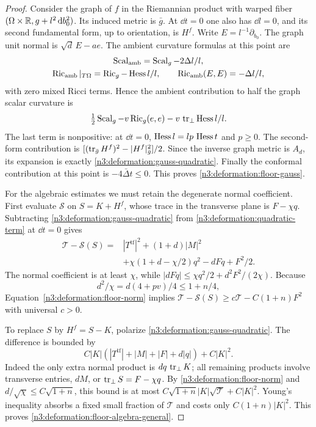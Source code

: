 \begin{proof}
Consider the graph of $f$ in the Riemannian product with warped fiber
$(\Omega\times\mathbb R,g+l^2\,\mathrm d b_0^2)$. Its induced metric is $\bar g$.
At $\dd t=0$ one also has $\dd l=0$, and its second fundamental form,
up to orientation, is $H^f$. Write $E=l^{-1}\partial_{b_0}$.
The graph unit normal is $\sqrt d\,E-ae$. The ambient curvature formulas
at this point are
\[
 \begin{gathered}
 \operatorname{Scal}_{\mathrm{amb}}=\operatorname{Scal}_g-2\Delta l/l,\\
 \operatorname{Ric}_{\mathrm{amb}}|_{T\Omega}=\operatorname{Ric}_g-\operatorname{Hess} l/l,\qquad
 \operatorname{Ric}_{\mathrm{amb}}(E,E)=-\Delta l/l,
 \end{gathered}
\]
with zero mixed Ricci terms. Hence the ambient contribution to half the
graph scalar curvature is
\[
 \tfrac12\operatorname{Scal}_g-v\operatorname{Ric}_g(e,e)
      -v\,\operatorname{tr}_\perp\operatorname{Hess} l/l.
\]
The last term is nonpositive: at $\dd t=0$,
$\operatorname{Hess} l=lp\,\operatorname{Hess} t$ and $p\ge0$.
The second-form contribution is
$[(\operatorname{tr}_{\bar g}H^f)^2-|H^f|_{\bar g}^2]/2$.
Since the inverse graph metric is $A_d$, its expansion is exactly
\eqref{n3:deformation:gauss-quadratic}.
Finally the conformal contribution at this point is
$-4\bar\Delta t\le0$. This proves \eqref{n3:deformation:floor-gauss}.

For the algebraic estimates we must retain the degenerate normal
coefficient. First evaluate $\mathcal S$ on
$S=K+H^f$, whose trace in the transverse plane is $F-\chi q$.
Subtracting \eqref{n3:deformation:gauss-quadratic} from
\eqref{n3:deformation:quadratic-term} at $\dd t=0$ gives
\begin{equation}\label{n3:deformation:floor-difference}
 \begin{split}
 \mathcal T-\mathcal S(S)
 ={}&|T^{\operatorname{tf}}|^2+(1+d)|M|^2\\
 &+\chi(1+d-\chi/2)q^2-dFq+F^2/2.
 \end{split}
\end{equation}
The normal coefficient is at least $\chi$, while
$|dFq|\le\chi q^2/2+d^2F^2/(2\chi)$.
Because
\[
 d^2/\chi=d(4+pv)/4\le1+n/4,
\]
Equation~\eqref{n3:deformation:floor-norm} implies
$\mathcal T-\mathcal S(S)\ge c\mathcal T-C(1+n)F^2$
with universal $c>0$.

To replace $S$ by $H^f=S-K$, polarize
\eqref{n3:deformation:gauss-quadratic}. The difference is bounded by
\[
 C|K|(|T^{\operatorname{tf}}|+|M|+|F|+d|q|)+C|K|^2.
\]
Indeed the only extra normal product is $dq\,\operatorname{tr}_\perp K$;
all remaining products involve transverse entries, $dM$, or
$\operatorname{tr}_\perp S=F-\chi q$.
By \eqref{n3:deformation:floor-norm} and $d/\sqrt\chi\le C\sqrt{1+n}$,
this bound is at most
$C\sqrt{1+n}|K|\sqrt{\mathcal T}+C|K|^2$.
Young's inequality absorbs a fixed small fraction of $\mathcal T$
and costs only $C(1+n)|K|^2$. This proves
\eqref{n3:deformation:floor-algebra-general}.


\end{proof}

